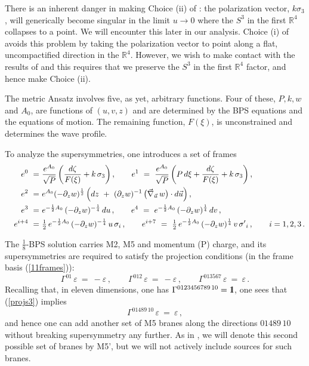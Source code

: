 \documentclass[11pt]{article}
\def\oneone{\rlap 1\mkern4mu{\rm l}}
\def\coeff#1#2{\relax{\textstyle \frac{#1}{#2}}\displaystyle}
\def\IR{\mathbb{R}}
\def\nca{{\zeta}}
\def\ncb{{\xi}}
\def\nBPS#1{$\frac{1}{#1}$-BPS}
\numberwithin{equation}{section}
\begin{document}
There is an inherent danger in making Choice (ii)  of \cite{Bena:2024qed}:  the polarization vector, $ k \sigma_3$, will generically become singular in the limit $u \to 0$ where the $S^3$ in the first $\IR^4$ collapses to a point. We will encounter this later in our analysis.  Choice (i)  of \cite{Bena:2024qed} avoids this problem by taking the polarization vector to point along a flat, uncompactified direction in the $\IR^4$.  However, we wish to make contact with the results of \cite{Bachas:2013vza,Bena:2025hxt} and this requires that we preserve the $S^3$ in the first $\IR^4$ factor, and hence  make Choice (ii). 

The metric Ansatz involves five, as yet, arbitrary functions.  Four of these,  $P, k, w$ and $A_0$, are functions of $(u,v,z)$ and are determined by the BPS equations and the equations of motion.  The remaining function, $F(\ncb)$, is unconstrained and determines the wave profile.   

To analyze the supersymmetries, one introduces a set of frames 
%
\begin{equation}
\begin{aligned}
e^0 ~=~  & \frac{e^{A_0} }{\sqrt{P} }\,\bigg( \frac{ d \nca}{F(\ncb) } + k \,  \sigma_3  \bigg)  \,, \qquad e^1~=~    \frac{e^{A_0} }{\sqrt{P} }\, \bigg(P \,  d  \ncb    +   \frac{ d \nca}{F(\ncb) } + k \,  \sigma_3 \bigg)   \,, \\ e^2 ~=~ &  e^{A_0} (-\partial_z w )^{\frac{1}{2}} \, \Big( dz ~+~(\partial_z w )^{-1}\,  \big (\vec \nabla_{\vec u} \, w \big)  \cdot  d \vec u \Big) \,, \\
\qquad e^3 ~=~& e^{- \frac{1}{2} A_0} \, (-\partial_z w )^{-\frac{1}{4}}\,   du  \,,   \qquad e^4 ~=~   e^{- \frac{1}{2} A_0} \, (-\partial_z w )^{\frac{1}{4}}\,  dv \,,\\
e^{i+4}~=~  &   \coeff{1}{2} \, e^{- \frac{1}{2} A_0} \, (-\partial_z w )^{-\frac{1}{4}}\, u \, \sigma_i  \,, \qquad e^{i+7} ~=~   \coeff{1}{2} \,  e^{- \frac{1}{2} A_0} \, (-\partial_z w )^{\frac{1}{4}}\, v \, {\sigma'}_i \,,   \qquad {i = 1,2,3}       \,.
\end{aligned}
 \label{11frames}
\end{equation}
%

The \nBPS{8} solution carries M2, M5 and momentum (P) charge, and its supersymmetries are required to satisfy the projection conditions (in the frame basis (\ref{11frames})): 
%
\begin{equation}
 \Gamma^{01} \, \varepsilon  ~=~ - \varepsilon \,,   \qquad   \Gamma^{012} \, \varepsilon  ~=~ - \varepsilon \,,   \qquad  \Gamma^{013567} \, \varepsilon  ~=~\varepsilon \,.
 \label{projs3}
\end{equation}
%
Recalling that, in eleven dimensions, one has $ \Gamma^{0123456789\,10} =  \oneone$, one sees that (\ref{projs3})  implies
%
\begin{equation}
 \Gamma^{01489\,10} \, \varepsilon  ~=~ \varepsilon \,,
 \label{projs2}
\end{equation}
%
and hence one can add another set of M5 branes along the directions $01489\,10$ without breaking supersymmetry any further.  As in \cite{Bena:2024qed}, we will denote this second possible set of branes by M5', but we will not actively include sources for such branes.
\end{document}
